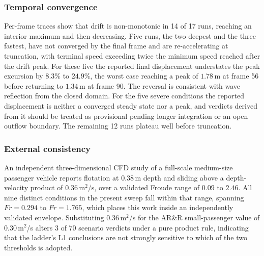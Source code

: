 \subsubsection{Temporal convergence}
Per-frame traces show that drift is non-monotonic in 14 of 17 runs, reaching an
interior maximum and then decreasing. Five runs, the two deepest and the three fastest,
have not converged by the final frame and are re-accelerating at truncation, with
terminal speed exceeding twice the minimum speed reached after the drift peak. For
these five the reported final displacement understates the peak excursion by $8.3\%$ to
$24.9\%$, the worst case reaching a peak of $1.78$\,m at frame 56 before returning to
$1.34$\,m at frame 90. The reversal is consistent with wave reflection from the closed
domain. For the five severe conditions the reported displacement is neither a converged
steady state nor a peak, and verdicts derived from it should be treated as provisional
pending longer integration or an open outflow boundary. The remaining 12 runs plateau
well before truncation.

\subsubsection{External consistency}
An independent three-dimensional CFD study of a full-scale medium-size passenger
vehicle reports flotation at $0.38$\,m depth and sliding above a depth-velocity product
of $0.36$\,m$^2$/s, over a validated Froude range of $0.09$ to $2.46$. All nine
distinct conditions in the present sweep fall within that range, spanning $Fr=0.294$ to
$Fr=1.765$, which places this work inside an independently validated envelope.
Substituting $0.36$\,m$^2$/s for the AR\&R small-passenger value of $0.30$\,m$^2$/s
alters 3 of 70 scenario verdicts under a pure product rule, indicating that the ladder's
L1 conclusions are not strongly sensitive to which of the two thresholds is adopted.
